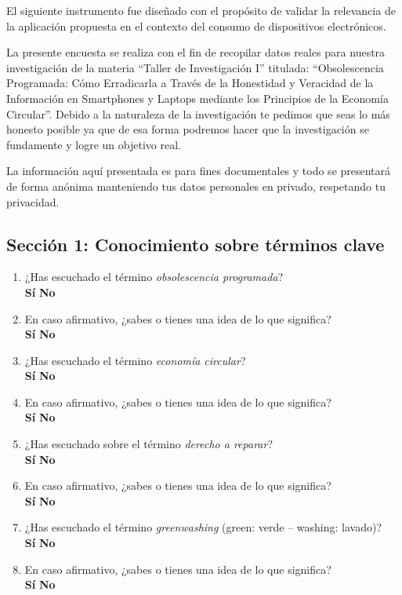 
El siguiente instrumento fue diseñado con el propósito de validar la relevancia
de la aplicación propuesta en el contexto del consumo de dispositivos
electrónicos.


\noindent  La presente encuesta se realiza con el fin de recopilar datos reales
para nuestra investigación de la materia ``Taller de Investigación I'' titulada:
``Obsolescencia Programada: Cómo Erradicarla a Través de la Honestidad y
Veracidad de la Información en Smartphones y Laptops mediante los Principios de
la Economía Circular''. Debido a la naturaleza de la investigación te pedimos
que seas lo más honesto posible ya que de esa forma podremos hacer que la
investigación se fundamente y logre un objetivo real.

\noindent La información aquí presentada es para fines documentales y todo se
presentará de forma anónima manteniendo tus datos personales en privado,
respetando tu privacidad.

\subsection*{Sección 1: Conocimiento sobre términos clave}

\begin{enumerate}
    \item ¿Has escuchado el término \textit{obsolescencia programada}? \\
    \textbf{Sí} \quad \textbf{No}
    
    \item En caso afirmativo, ¿sabes o tienes una idea de lo que significa?\\
    \textbf{Sí} \quad \textbf{No}

    \item ¿Has escuchado el término \textit{economía circular}? \\
    \textbf{Sí} \quad \textbf{No}

    \item En caso afirmativo, ¿sabes o tienes una idea de lo que significa? \\
    \textbf{Sí} \quad \textbf{No}
    
    \item ¿Has escuchado sobre el término \textit{derecho a reparar}? \\
    \textbf{Sí} \quad \textbf{No}
    
    \item En caso afirmativo, ¿sabes o tienes una idea de lo que significa? \\
    \textbf{Sí} \quad \textbf{No}
    
    \item ¿Has escuchado el término \textit{greenwashing} (green: verde –
    washing: lavado)? \\
    \textbf{Sí} \quad \textbf{No}
    
    \item En caso afirmativo, ¿sabes o tienes una idea de lo que significa? \\
    \textbf{Sí} \quad \textbf{No}
\end{enumerate}

